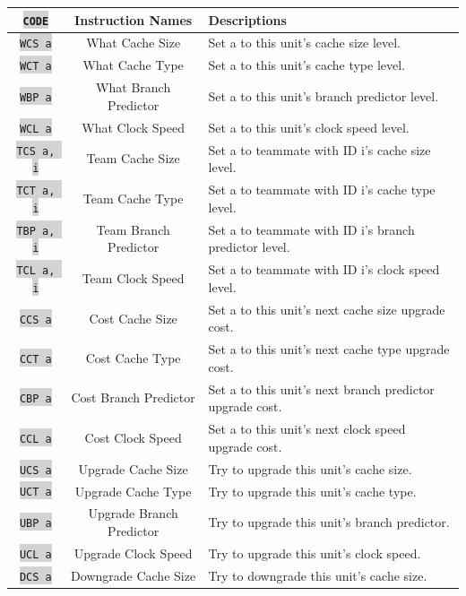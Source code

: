 \documentclass{article}
\newcommand{\vnscode}[1]{\colorbox{lightgray}{\lstinline[language=vns]{#1}}}
\begin{document}
\begin{minipage}{\textwidth}
\label{table:upgrade}
\centering
\begin{tabular}{|c|c|l|}
    \hline \vnscode{CODE} & Instruction Names & Descriptions \\ \hline
    \vnscode{WCS a} & What Cache Size & Set a to this unit's cache size level.  \\ \hline
    \vnscode{WCT a} & What Cache Type & Set a to this unit's cache type level.  \\ \hline
    \vnscode{WBP a} & What Branch Predictor & Set a to this unit's branch predictor level. \\ \hline
    \vnscode{WCL a} & What Clock Speed & Set a to this unit's clock speed level.  \\ \hline
    \vnscode{TCS a, i} & Team Cache Size & Set a to teammate with ID i's cache size level. \\ \hline
    \vnscode{TCT a, i} & Team Cache Type & Set a to teammate with ID i's cache type level. \\ \hline
    \vnscode{TBP a, i} & Team Branch Predictor & Set a to teammate with ID i's branch predictor level. \\ \hline
    \vnscode{TCL a, i} & Team Clock Speed & Set a to teammate with ID i's clock speed level. \\ \hline
    \vnscode{CCS a} & Cost Cache Size & Set a to this unit's next cache size upgrade cost. \\ \hline
    \vnscode{CCT a} & Cost Cache Type & Set a to this unit's next cache type upgrade cost. \\ \hline
    \vnscode{CBP a} & Cost Branch Predictor & Set a to this unit's next branch predictor upgrade cost. \\ \hline
    \vnscode{CCL a} & Cost Clock Speed & Set a to this unit's next clock speed upgrade cost. \\ \hline
    \vnscode{UCS a} & Upgrade Cache Size & Try to upgrade this unit's cache size. \\ \hline
    \vnscode{UCT a} & Upgrade Cache Type & Try to upgrade this unit's cache type. \\ \hline
    \vnscode{UBP a} & Upgrade Branch Predictor & Try to upgrade this unit's branch predictor. \\ \hline
    \vnscode{UCL a} & Upgrade Clock Speed & Try to upgrade this unit's clock speed. \\ \hline
    \vnscode{DCS a} & Downgrade Cache Size & Try to downgrade this unit's cache size. \\ \hline

\end{tabular}
\end{minipage}
\end{document}
